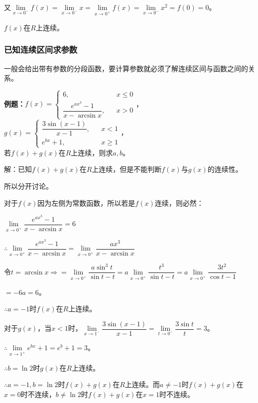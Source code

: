 \documentclass[UTF8, 12pt]{ctexart}
\begin{document}
又$\lim\limits_{x\to 0^-}f(x)=\lim\limits_{x\to 0^-}x=\lim\limits_{x\to 0^+}f(x)=\lim\limits_{x\to 0^-}x^2=f(0)=0$。

$f(x)$在$R$上连续。

\subsubsection{已知连续区间求参数}

一般会给出带有参数的分段函数，要计算参数就必须了解连续区间与函数之间的关系。

\textbf{例题：}$f(x)=\left\{\begin{array}{lcl}
        6,                               &  & x\leqslant 0 \\
    \dfrac{e^{ax^3}-1}{x-\arcsin x}, &  & x>0
    \end{array}
    \right.$，$g(x)=\left\{\begin{array}{lcl}
        \dfrac{3\sin(x-1)}{x-1}, &  & x<1          \\
        e^{bx}+1,                &  & x\geqslant 1
    \end{array}
    \right.$，\smallskip \\ 若$f(x)+g(x)$在$R$上连续，则求$a,b$。

解：已知$f(x)+g(x)$在$R$上连续，但是不能判断$f(x)$与$g(x)$的连续性。

所以分开讨论。

对于$f(x)$因为左侧为常数函数，所以若是$f(x)$连续，则必然：\medskip

$\lim\limits_{x\to 0^+}\dfrac{e^{ax^3}-1}{x-\arcsin x}=6$\medskip

$\therefore\lim\limits_{x\to 0^+}\dfrac{e^{ax^3}-1}{x-\arcsin x}=\lim\limits_{x\to 0^+}\dfrac{ax^3}{x-\arcsin x}$\medskip

$\text{令}t=\arcsin x\Rightarrow=\lim\limits_{x\to 0^+}\dfrac{a\sin^3t}{\sin t-t}=a\lim\limits_{x\to 0^+}\dfrac{t^3}{\sin t-t}=a\lim\limits_{x\to 0^+}\dfrac{3t^2}{\cos t-1}$

$=-6a=6$。

$\therefore a=-1$时$f(x)$在$R$上连续。\medskip

对于$g(x)$，当$x<1$时，$\lim\limits_{x\to 1^-}\dfrac{3\sin(x-1)}{x-1}=\lim\limits_{t\to 0^-}\dfrac{3\sin t}{t}=3$。\medskip

$\therefore\lim\limits_{x\to 1^+}e^{bx}+1=e^b+1=3$。\medskip

$\therefore b=\ln 2$时$g(x)$在$R$上连续。\medskip

$\therefore a=-1,b=\ln 2$时$f(x)+g(x)$在$R$上连续。而$a\neq -1$时$f(x)+g(x)$在$x=0$时不连续，$b\neq\ln 2$时$f(x)+g(x)$在$x=1$时不连续。
\end{document}
